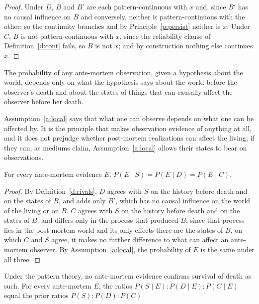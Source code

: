 \documentclass{situationist-preprint}
\begin{document}
\begin{proof}
Under $D$, $B$ and $B'$ are each pattern-continuous with $x$ and, since $B'$ has no causal influence on $B$ and conversely, neither is pattern-continuous with the other; so the continuity branches and by Principle~\ref{p:persist} neither is $x$. Under $C$, $B$ is not pattern-continuous with $x$, since the reliability clause of Definition~\ref{d:cont} fails, so $B$ is not $x$; and by construction nothing else continues $x$.
\end{proof}

\begin{assumption}\label{a:local}
The probability of any ante-mortem observation, given a hypothesis about the world, depends only on what the hypothesis says about the world before the observer's death and about the states of things that can causally affect the observer before her death.
\end{assumption}

Assumption~\ref{a:local} says that what one can observe depends on what one can be affected by. It is the principle that makes observation evidence of anything at all, and it does not prejudge whether post-mortem realizations can affect the living; if they can, as mediums claim, Assumption~\ref{a:local} allows their states to bear on observations.

\begin{lemma}[Parity]\label{l:parity}
For every ante-mortem evidence $E$, $P(E \mid S) = P(E \mid D) = P(E \mid C)$.
\end{lemma}

\begin{proof}
By Definition~\ref{d:rivals}, $D$ agrees with $S$ on the history before death and on the states of $B$, and adds only $B'$, which has no causal influence on the world of the living or on $B$. $C$ agrees with $S$ on the history before death and on the states of $B$, and differs only in the process that produced $B$; since that process lies in the post-mortem world and its only effects there are the states of $B$, on which $C$ and $S$ agree, it makes no further difference to what can affect an ante-mortem observer. By Assumption~\ref{a:local}, the probability of $E$ is the same under all three.
\end{proof}

\begin{theorem}\label{t:inacc}
Under the pattern theory, no ante-mortem evidence confirms survival of death as such. For every ante-mortem $E$, the ratios $P(S \mid E) : P(D \mid E) : P(C \mid E)$ equal the prior ratios $P(S) : P(D) : P(C)$.
\end{theorem}
\end{document}
